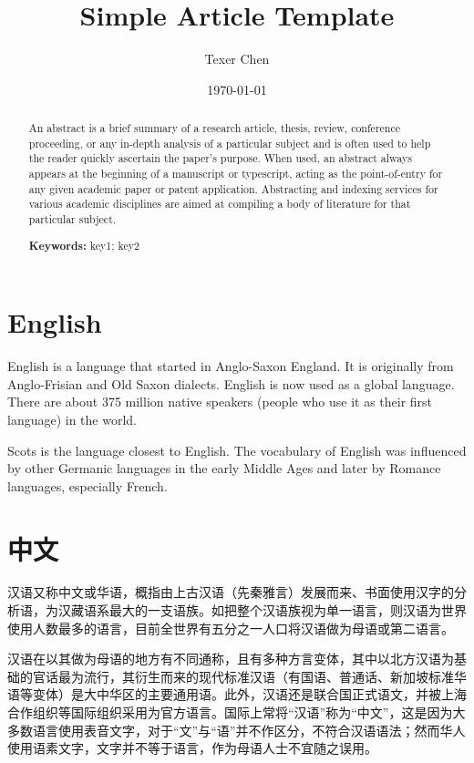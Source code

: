 \documentclass[12pt,twoside]{article}
\title{Simple Article Template}
\author{Texer Chen}
\date{\today}
\begin{document}
\maketitle






\begin{abstract}
An abstract is a brief summary of a research article, thesis, review, conference proceeding, or any in-depth analysis of a particular subject and is often used to help the reader quickly ascertain the paper's purpose. When used, an abstract always appears at the beginning of a manuscript or typescript, acting as the point-of-entry for any given academic paper or patent application. Abstracting and indexing services for various academic disciplines are aimed at compiling a body of literature for that particular subject.

\textbf{Keywords:} 
key1; key2
\end{abstract}



\section{English}

English is a language that started in Anglo-Saxon England. It is originally from Anglo-Frisian and Old Saxon dialects. English is now used as a global language. There are about 375 million native speakers (people who use it as their first language) in the world.

Scots is the language closest to English. The vocabulary of English was influenced by other Germanic languages in the early Middle Ages and later by Romance languages, especially French.


\section{中文}

汉语又称中文或华语，概指由上古汉语（先秦雅言）发展而来、书面使用汉字的分析语，为汉藏语系最大的一支语族。如把整个汉语族视为单一语言，则汉语为世界使用人数最多的语言，目前全世界有五分之一人口将汉语做为母语或第二语言。

汉语在以其做为母语的地方有不同通称，且有多种方言变体，其中以北方汉语为基础的官话最为流行，其衍生而来的现代标准汉语（有国语、普通话、新加坡标准华语等变体）是大中华区的主要通用语。此外，汉语还是联合国正式语文，并被上海合作组织等国际组织采用为官方语言。国际上常将“汉语”称为“中文”，这是因为大多数语言使用表音文字，对于“文”与“语”并不作区分，不符合汉语语法；然而华人使用语素文字，文字并不等于语言，作为母语人士不宜随之误用。
\end{document}
